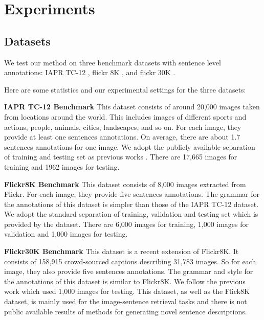 
\section{Experiments}

\subsection{Datasets}
We test our method on three benchmark datasets with sentence level annotations: IAPR TC-12 \cite{grubinger2006iapr}, flickr 8K \cite{rashtchian2010collecting}, and flickr 30K \cite{hodoshimage}.

Here are some statistics and our experimental settings for the three datasets:

\textbf{IAPR TC-12 Benchmark}  This dataset consists of around 20,000 images taken from locations around the world.
This includes images of different sports and actions, people, animals, cities, landscapes, and so on.
For each image, they provide at least one sentences annotations.
On average, there are about 1.7 sentences annotations for one image.
We adopt the publicly available separation of training and testing set as previous works \cite{GVS10a,kiros2013multimodal}.
There are 17,665 images for training and 1962 images for testing.

\textbf{Flickr8K Benchmark}  This dataset consists of 8,000 images extracted from Flickr.
For each image, they provide five sentences annotations.
The grammar for the annotations of this dataset is simpler than those of the IAPR TC-12 dataset.
We adopt the standard separation of training, validation and testing set which is provided by the dataset.
There are 6,000 images for training, 1,000 images for validation and 1,000 images for testing.

\textbf{Flickr30K Benchmark}  This dataset is a recent extension of Flickr8K.
It consists of 158,915 crowd-sourced captions describing 31,783 images.
So for each image, they also provide five sentences annotations.
The grammar and style for the annotations of this dataset is similar to Flickr8K.
We follow the previous work \cite{karpathy2014fragment} which used 1,000 images for testing.
This dataset, as well as the Flick8K dataset, is mainly used for the image-sentence retrieval tasks and there is not public available results of methods for generating novel sentence descriptions.

